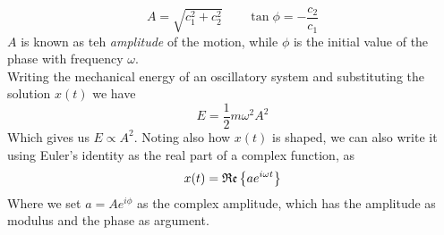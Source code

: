 \documentclass[../admech.tex]{subfiles}
\begin{document}
\begin{equation}
	A=\sqrt{c_1^2+c_2^2}\qquad\tan\phi=-\frac{c_2}{c_1}
	\label{eq:Aphic1c2}
\end{equation}
$A$ is known as teh \emph{amplitude} of the motion, while $\phi$ is the initial value of the phase with frequency $\omega$.\\
Writing the mechanical energy of an oscillatory system and substituting the solution $x(t)$ we have
\begin{equation}
	E=\frac{1}{2}m\omega^2A^2
	\label{eq:energypropamp}
\end{equation}
Which gives us $E\propto A^2$. Noting also how $x(t)$ is shaped, we can also write it using Euler's identity as the real part of a complex function, as
\begin{equation}
	x(t)=\mathfrak{Re}\left\{ ae^{i\omega t} \right\}
	\label{eq:complexoscsol}
\end{equation}
Where we set $a=Ae^{i\phi}$ as the complex amplitude, which has the amplitude as modulus and the phase as argument.
\end{document}
